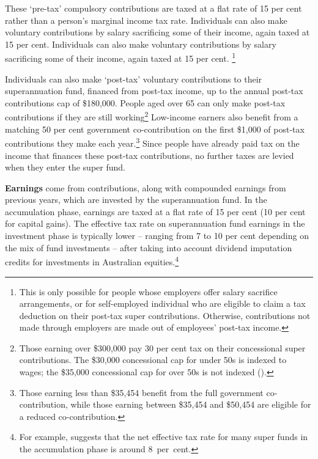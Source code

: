 \documentclass{grattanAlpha}
\begin{document}
These ‘pre-tax’ compulsory contributions are taxed at a flat rate of 15 per cent rather than a person’s marginal income tax rate. Individuals can also make voluntary contributions by salary sacrificing some of their income, again taxed at 15 per cent. Individuals can also make voluntary contributions by salary sacrificing some of their income, again taxed at 15 per cent.%
\footnote{%
This is only possible for people whose employers offer salary sacrifice arrangements, or for self-employed individual who are eligible to claim a tax deduction on their post-tax super contributions. Otherwise, contributions not made through employers are made out of employees’ post-tax income.%
}  

Individuals can also make ‘post-tax’ voluntary contributions to their superannuation fund, financed from post-tax income, up to the annual post-tax contributions cap of \$180,000.  People aged over 65 can only make post-tax contributions if they are still working\footnote{Those earning over \$300,000 pay 30 per cent tax on their concessional super contributions. The \$30,000 concessional cap for under 50s is indexed to wages; the \$35,000 concessional cap for over 50s is not indexed (\textcite{ATO2015ConcessionalContrCap}).}  Low-income earners also benefit from a matching 50 per cent government co-contribution on the first \$1,000 of post-tax contributions they make each year.\footnote{\textcites{ATO2015SuperCoContr}{ATO2015IncomeThresholdTest} Those earning less than \$35,454 benefit from the full government co-contribution, while those earning between \$35,454 and \$50,454 are eligible for a reduced co-contribution.} Since people have already paid tax on the income that finances these post-tax contributions, no further taxes are levied when they enter the super fund.

\textbf{Earnings} come from contributions, along with compounded earnings from previous years, which are invested by the superannuation fund. In the accumulation phase, earnings are taxed at a flat rate of 15 per cent (10 per cent for capital gains). The effective tax rate on superannuation fund earnings in the investment phase is typically lower – ranging from 7 to 10 per cent depending on the mix of fund investments – after taking into account dividend imputation credits for investments in Australian equities.\footnote{For example, \textcite[][39]{Mercer2015GlobalPensionIndex}  suggests that the net effective tax rate for many super funds in the accumulation phase is around 8~per~cent.}
\end{document}
